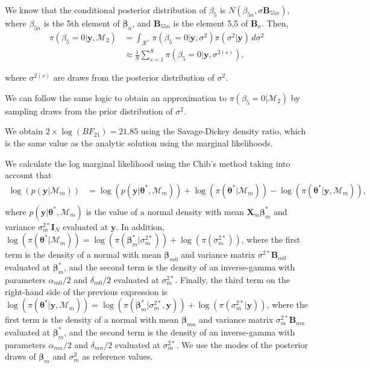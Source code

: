 We know that the conditional posterior distribution of $\beta_5$ is $N(\beta_{5n}, \sigma \bm{B}_{55n})$, where $\beta_{5n}$ is the 5th element of $\bm{\beta}_n$, and $\bm{B}_{55n}$ is the element 5,5 of $\bm{B}_n$. Then,
\begin{align*}
	\pi(\beta_5=0|\bm{y}, \mathcal{M}_2) &= \int_{\mathcal{R}^+} \pi(\beta_5=0|\bm{y}, \sigma^2) \pi(\sigma^2|\bm{y}) \, d\sigma^2 \\
	&\approx \frac{1}{S} \sum_{s=1}^S \pi(\beta_5=0|\bm{y}, \sigma^{2(s)}),
\end{align*}

where $\sigma^{2(s)}$ are draws from the posterior distribution of $\sigma^2$.

We can follow the same logic to obtain an approximation to $\pi(\beta_5=0|\mathcal{M}_2)$ by sampling draws from the prior distribution of $\sigma^2$.

We obtain $2 \times \log(BF_{21}) = 21.85$ using the Savage-Dickey density ratio, which is the same value as the analytic solution using the marginal likelihoods.
  

We calculate the log marginal likelihood using the Chib's method taking into account that 
\begin{align*}
	\log(p(\bm{y}|\mathcal{M}_m))&=\log(p(\bm{y}|\bm{\theta}^*,\mathcal{M}_m))+\log(\pi(\bm{\theta}^*|\mathcal{M}_m))-\log(\pi(\bm{\theta}^*|\bm{y},\mathcal{M}_m)),\\
\end{align*}
where $p(\bm{y}|\bm{\theta}^*,\mathcal{M}_m)$ is the value of a normal density with mean $\bm{X}_m\bm{\beta}_{m}^*$ and variance $\sigma^{2*}_m\bm{I}_N$ evaluated at $\bm{y}$. In addition, $\log(\pi(\bm{\theta}^*|\mathcal{M}_m))=\log(\pi(\bm{\beta}_m^*|\sigma^{2*}_m))+\log(\pi(\sigma^{2*}_m))$, where the first term is the density of a normal with mean $\bm{\beta}_{m0}$ and variance matrix $\sigma^{2*}\bm{B}_{m0}$ evaluated at $\bm{\beta}_m^*$, and the second term is the density of an inverse-gamma with parameters $\alpha_{m0}/2$ and $\delta_{m0}/2$ evaluated at $\sigma^{2*}_m$. Finally, the third term on the right-hand side of the previous expression is $\log(\pi(\bm{\theta}^*|\bm{y},\mathcal{M}_m))=\log(\pi(\bm{\beta}_m^*|\sigma^{2*}_m,\bm{y}))+\log(\pi(\sigma^{2*}_m|\bm{y}))$, where the first term is the density of a normal with mean $\bm{\beta}_{mn}$ and variance matrix $\sigma^{2*}_m\bm{B}_{mn}$ evaluated at $\bm{\beta}_m^*$, and the second term is the density of an inverse-gamma with parameters $\alpha_{mn}/2$ and $\delta_{mn}/2$ evaluated at $\sigma^{2*}_m$. We use the modes of the posterior draws of $\bm{\beta}_m$ and $\sigma^2_m$ as reference values. 

